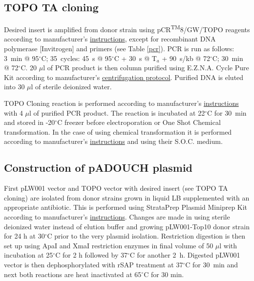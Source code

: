 \subsection{TOPO TA cloning}
Desired insert is amplified from donor strain using pCR\textsuperscript{TM}8/GW/TOPO\textsuperscript{\textregistered} reagents according to manufacturer's \href{https://assets.thermofisher.com/TFS-Assets/LSG/manuals/pcr8gwtopo_man.pdf}{instructions}, except for recombinant  DNA polymerase [Invitrogen] and primers (see Table \ref{pcr}).
PCR is run as follows: 3~min @ 95$^{\circ}$C; 35~cycles: 45~s @ 95$^{\circ}$C + 30~s @ T$_{a}$ + 90~s/kb @ 72$^{\circ}$C; 30~min @ 72$^{\circ}$C.
20 $\mu$l of PCR product is then column purified using E.Z.N.A.\textsuperscript{\textregistered} Cycle Pure Kit according to manufacturer's \href{http://omegabiotek.com/store/wp-content/uploads/2013/09/D6492_D6493-Cycle-Pure-Kit-Combo-Online.pdf}{centrifugation protocol}.
Purified DNA is eluted into 30 $\mu$l of sterile deionized water.

TOPO\textsuperscript{\textregistered} Cloning reaction is performed according to manufacturer's \href{https://assets.thermofisher.com/TFS-Assets/LSG/manuals/pcr8gwtopo_man.pdf}{instructions} with 4 $\mu$l of purified PCR product.
The reaction is incubated at 22$^{\circ}$C for 30~min and stored in -20$^{\circ}$C freezer before electroporation or One Shot\textsuperscript{\textregistered} Chemical transformation.
In the case of using chemical transformation it is performed according to manufacturer's \href{https://assets.thermofisher.com/TFS-Assets/LSG/manuals/pcr8gwtopo_man.pdf}{instructions} and using their S.O.C. medium.

\subsection{Construction of pADOUCH plasmid}
First pLW001 vector and TOPO vector with desired insert (see TOPO TA cloning) are isolated from donor strains grown in liquid LB supplemented with an appropriate antibiotic.
This is performed using StrataPrep Plasmid Miniprep Kit according to manufacturer's \href{https://www.agilent.com/cs/library/usermanuals/public/400766.pdf}{instructions}.
Changes are made in using sterile deionized water instead of elution buffer and growing pLW001-Top10 donor strain for 24 h at 30$^{\circ}$C prior to the very plasmid isolation.
Restriction digestion is then set up using ApaI and XmaI restriction enzymes in final volume of 50 $\mu$l with incubation at 25$^{\circ}$C for 2 h followed by 37$^{\circ}$C for another 2~h.
Digested pLW001 vector is then dephosphorylated with rSAP treatment at 37$^{\circ}$C for 30~min and next both reactions are heat inactivated at 65$^{\circ}$C for 30 min.

